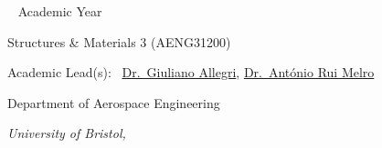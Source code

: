 \restoregeometry
\endgroup

\newpage
~\vfill
\thispagestyle{empty}
\setlength{\parindent}{0pt}
\setlength{\parskip}{\baselineskip}
\large Academic Year \the{} \par
\large Structures \& Materials 3 (AENG31200) \par
\large Academic Lead(s): \, \href{giuliano.allegri@bristol.ac.uk}{Dr.~Giuliano Allegri}, \href{antonio.melro@bristol.ac.uk}{Dr.~Ant\'{o}nio Rui Melro} \par
\par Department of Aerospace Engineering

\par\textit{University of Bristol, \monthyear}
\cleardoublepage
